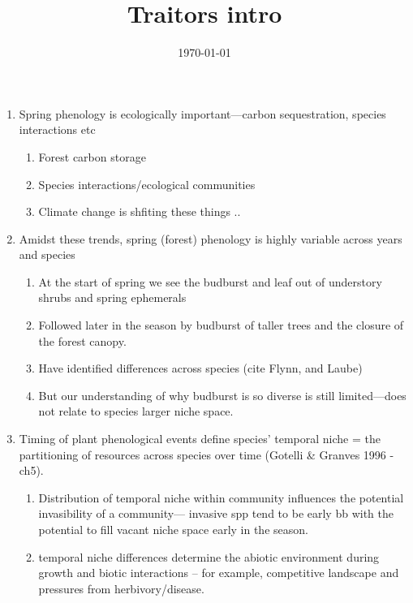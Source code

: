 \documentclass{article}
\begin{document}
\title{Traitors intro}
\date{\today}

\maketitle 

\begin{enumerate}

\item Spring phenology is ecologically important---carbon sequestration, species interactions etc %
\begin{enumerate}
\item Forest carbon storage
\item Species interactions/ecological communities 
\item Climate change is shfiting these things ..
\end{enumerate}

\item Amidst these trends, spring (forest) phenology is highly variable across years and species %
\begin{enumerate}
\item At the start of spring we see the budburst and leaf out of understory shrubs and spring ephemerals
\item Followed later in the season by budburst of taller trees and the closure of the forest canopy.
\item Have identified differences across species (cite Flynn, and Laube)
\item But our understanding of why budburst is so diverse is still limited---does not relate to species larger niche space.
\end{enumerate} 

\item Timing of plant phenological events define species' temporal niche = the partitioning of resources across species over time (Gotelli \& Granves 1996 - ch5). %
\begin{enumerate}
\item Distribution of temporal niche within community influences the potential invasibility of a community--- invasive spp tend to be early bb with the potential to fill vacant niche space early in the season. 
\item temporal niche differences determine the abiotic environment during growth and biotic interactions -- for example, competitive landscape and pressures from herbivory/disease. %


\end{enumerate}
\end{enumerate}
\end{document}
